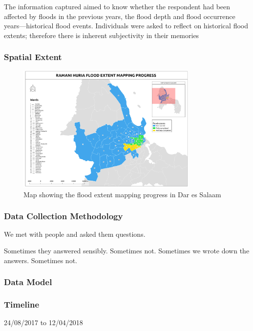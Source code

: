 \documentclass[a4paper,12pt,twoside]{article}
\begin{document}
\medskip

The information captured aimed to know whether the respondent had been affected by floods in the previous years, the flood depth and flood occurrence years---historical flood events. Individuals were asked to reflect on historical flood extents; therefore there is inherent subjectivity in their memories

\subsubsection{Spatial Extent}

\begin{figure}[h]
  \color{RHgreen}\caption{Map showing the flood extent mapping progress in Dar es Salaam}
  \centering
  \includegraphics[width=0.8\textwidth]{images/RH_Flood_Extent_Progress.png}
\end{figure}

\subsubsection{Data Collection Methodology}

We met with people and asked them questions.

Sometimes they answered sensibly. Sometimes not. Sometimes we wrote down the answers. Sometimes not.

\subsubsection{Data Model}

\subsubsection{Timeline}
24/08/2017 to 12/04/2018
\end{document}
